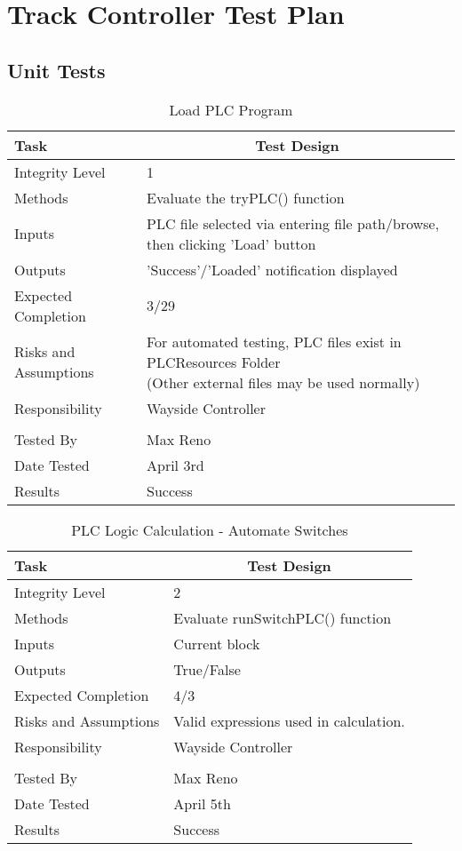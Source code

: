 \documentclass[]{article}
\begin{document}
\section{Track Controller Test Plan}
\subsection{Unit Tests}
\begin{table}[H]
	\centering
	\caption{Load PLC Program}
	\begin{tabular}{|l|l|}
		\hline
		Task & \multicolumn{1}{c|}{Test Design} \\ \hline
		Integrity Level & 1 \\ \hline
		Methods & Evaluate the tryPLC() function\\ \hline
		Inputs &  PLC file selected via entering file path/browse, then clicking 'Load' button \\ \hline
		Outputs &  'Success'/'Loaded' notification displayed \\ \hline
		Expected Completion & 3/29\\ \hline
		Risks and Assumptions & \parbox[t]{10cm}{For automated testing, PLC files exist in PLCResources Folder \\(Other external files may be used normally)} \\ \hline
		Responsibility & Wayside Controller\\ \hline
		\\ \hline
		Tested By   &  Max Reno\\ \hline
		Date Tested & \parbox[t]{10cm}{April 3rd}\\ \hline
		Results & Success\\ \hline
	\end{tabular}
\end{table}

\begin{table}[H]
	\centering
	\caption{PLC Logic Calculation - Automate Switches}
	\begin{tabular}{|l|l|}
		\hline
		Task & \multicolumn{1}{c|}{Test Design} \\ \hline
		Integrity Level & 2 \\ \hline
		Methods & Evaluate runSwitchPLC() function\\ \hline
		Inputs &  Current block \\ \hline
		Outputs &  True/False \\ \hline
		Expected Completion & 4/3\\ \hline
		Risks and Assumptions & \parbox[t]{10cm}{Valid expressions used in calculation.} \\ \hline
		Responsibility & Wayside Controller\\ \hline
		\\ \hline
		Tested By   &  Max Reno\\	\hline
		Date Tested & \parbox[t]{10cm}{April 5th}\\ \hline
		Results & Success\\ \hline
	\end{tabular}
\end{table}
\end{document}
